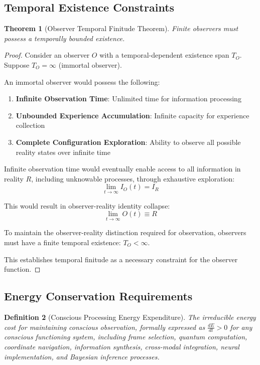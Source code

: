 \documentclass[12pt,a4paper]{article}
\newtheorem{theorem}{Theorem}[section]
\newtheorem{definition}[theorem]{Definition}
\begin{document}
\subsection{Temporal Existence Constraints}

\begin{theorem}[Observer Temporal Finitude Theorem]
Finite observers must possess a temporally bounded existence.
\end{theorem}

\begin{proof}
Consider an observer $O$ with a temporal-dependent existence span $T_O$. Suppose $T_O = \infty$ (immortal observer).

An immortal observer would possess the following:
\begin{enumerate}
\item \textbf{Infinite Observation Time}: Unlimited time for information processing
\item \textbf{Unbounded Experience Accumulation}: Infinite capacity for experience collection
\item \textbf{Complete Configuration Exploration}: Ability to observe all possible reality states over infinite time
\end{enumerate}

Infinite observation time would eventually enable access to all information in reality $R$, including unknowable processes, through exhaustive exploration:
$$\lim_{t \to \infty} I_O(t) = I_R$$

This would result in observer-reality identity collapse:
$$\lim_{t \to \infty} O(t) \equiv R$$

To maintain the observer-reality distinction required for observation, observers must have a finite temporal existence: $T_O < \infty$.

This establishes temporal finitude as a necessary constraint for the observer function.
\end{proof}

\subsection{Energy Conservation Requirements}

\begin{definition}[Conscious Processing Energy Expenditure]
The irreducible energy cost for maintaining conscious observation, formally expressed as $\frac{dE}{dt} > 0$ for any conscious functioning system, including frame selection, quantum computation, coordinate navigation, information synthesis, cross-modal integration, neural implementation, and Bayesian inference processes.
\end{definition}
\end{document}
